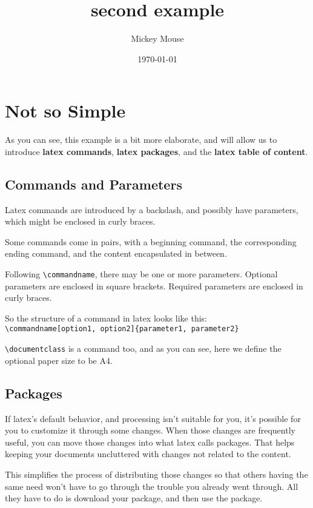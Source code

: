 \documentclass[a4paper]{book}
\author{Mickey Mouse}
\date{\today}
\title{second example}
\begin{document}
\maketitle
\tableofcontents


\chapter{Not so Simple}

As you can see, this example is a bit more elaborate, and will allow us to
introduce \textbf{latex commands}, \textbf{latex packages}, and the
\textbf{latex table of content}.


\section{Commands and Parameters}

Latex commands are introduced by a backslash, and possibly have parameters,
which might be enclosed in curly braces.

Some commands come in pairs, with a beginning command, the corresponding ending
command, and the content encapsulated in between.

Following \verb`\commandname`, there may be one or more parameters. Optional
parameters are enclosed in square brackets. Required parameters are enclosed
in curly braces.

So the structure of a command in latex looks like this:\\
\verb`\commandname[option1, option2]{parameter1, parameter2}`

\verb`\documentclass` is a command too, and as you can see, here we define the
optional paper size to be A4.


\section{Packages}

If latex's default behavior, and processing isn't suitable for you, it's
possible for you to customize it through some changes. When those changes are
frequently useful, you can move those changes into what latex calls packages.
That helps keeping your documents uncluttered with changes not related to the
content.

This simplifies the process of distributing those changes so that others having
the same need won't have to go through the trouble you already went through.
All they have to do is download your package, and then use the package.
\end{document}
